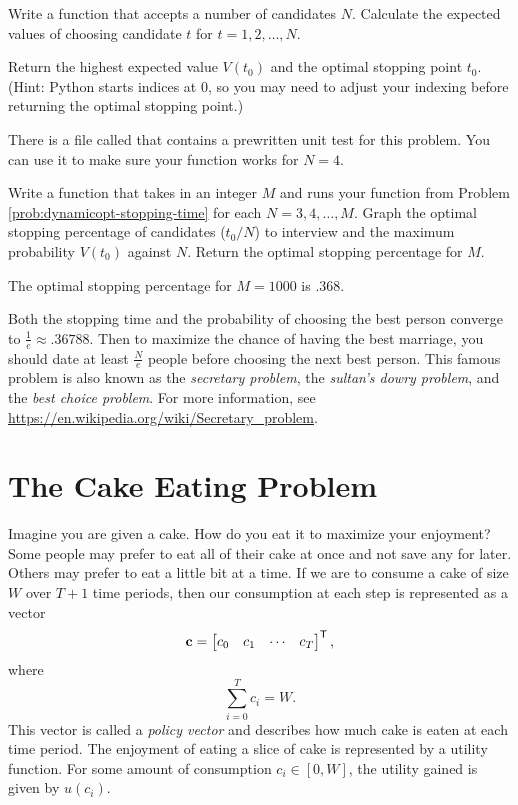 \begin{problem}
Write a function that accepts a number of candidates $N$.
Calculate the expected values of choosing candidate $t$ for $t=1,2,\ldots,N$.

Return the highest expected value $V(t_0)$ and the optimal stopping point $t_0$.
(Hint: Python starts indices at 0, so you may need to adjust your indexing before returning the optimal stopping point.)

There is a file called  that contains a prewritten unit test for this problem.
You can use it to make sure your function works for $N = 4$.
\label{prob:dynamicopt-stopping-time}
\end{problem}

\begin{problem}
Write a function that takes in an integer $M$ and runs your function from Problem \ref{prob:dynamicopt-stopping-time} for each $N=3,4,\ldots,M$.
Graph the optimal stopping percentage of candidates ($t_0/N$) to interview and the maximum probability $V(t_0)$ against $N$.
Return the optimal stopping percentage for $M$.

The optimal stopping percentage for $M=1000$ is $.368$.
\end{problem}

Both the stopping time and the probability of choosing the best person converge to $\frac{1}{e} \approx .36788$.
Then to maximize the chance of having the best marriage, you should date at least $\frac{N}{e}$ people before choosing the next best person.
This famous problem is also known as the \emph{secretary problem}, the \emph{sultan's dowry problem}, and the \emph{best choice problem}.
For more information, see \url{https://en.wikipedia.org/wiki/Secretary_problem}.


\section*{The Cake Eating Problem} %

Imagine you are given a cake.
How do you eat it to maximize your enjoyment?
Some people may prefer to eat all of their cake at once and not save any for later.
Others may prefer to eat a little bit at a time.
If we are to consume a cake of size $W$ over $T+1$ time periods, then our consumption at each step is represented as a vector
\[
\mathbf{c}=\begin{bmatrix}c_0 & c_1 & \cdots & c_T\end{bmatrix}^{\mathsf T},
\]
where
\[
\sum_{i=0}^T c_i = W.
\]
This vector is called a \emph{policy vector} and describes how much cake is eaten at each time period.
The enjoyment of eating a slice of cake is represented by a utility function.
For some amount of consumption $c_i \in [0, W]$, the utility gained is given by
$u(c_i)$.

